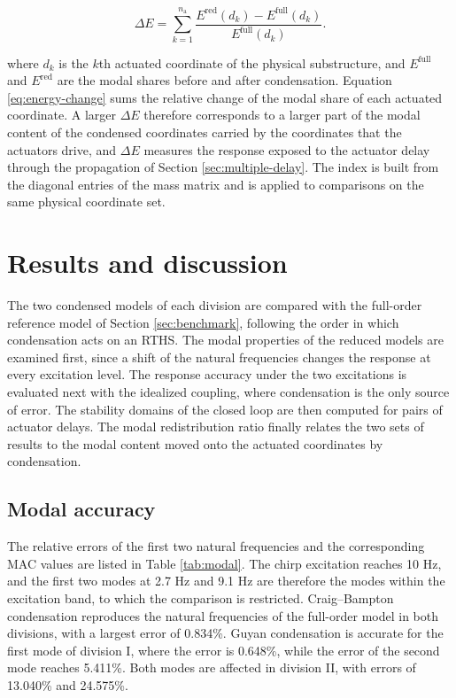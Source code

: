 \documentclass[a4paper,fleqn,review,12pt]{cas-sc}
\numberwithin{equation}{section}
\begin{document}
\vspace{-3.5em}
\begin{equation}
	\Delta E=\sum_{k=1}^{n_{\mathrm{a}}}
	\frac{E^{\mathrm{red}}(d_{k})-E^{\mathrm{full}}(d_{k})}{E^{\mathrm{full}}(d_{k})}.
	\label{eq:energy-change}
\end{equation}
\vspace{-3.5em}

\noindent where \(d_{k}\) is the \(k\)th actuated coordinate of the physical substructure, and \(E^{\mathrm{full}}\) and \(E^{\mathrm{red}}\) are the modal shares before and after condensation. Equation \eqref{eq:energy-change} sums the relative change of the modal share of each actuated coordinate. A larger \(\Delta E\) therefore corresponds to a larger part of the modal content of the condensed coordinates carried by the coordinates that the actuators drive, and \(\Delta E\) measures the response exposed to the actuator delay through the propagation of Section \ref{sec:multiple-delay}. The index is built from the diagonal entries of the mass matrix and is applied to comparisons on the same physical coordinate set.




\section{Results and discussion} \label{sec5}

The two condensed models of each division are compared with the full-order reference model of Section \ref{sec:benchmark}, following the order in which condensation acts on an RTHS. The modal properties of the reduced models are examined first, since a shift of the natural frequencies changes the response at every excitation level. The response accuracy under the two excitations is evaluated next with the idealized coupling, where condensation is the only source of error. The stability domains of the closed loop are then computed for pairs of actuator delays. The modal redistribution ratio finally relates the two sets of results to the modal content moved onto the actuated coordinates by condensation.

\subsection{Modal accuracy}
\label{sec:modal-accuracy}

The relative errors of the first two natural frequencies and the corresponding MAC values are listed in Table \ref{tab:modal}. The chirp excitation reaches 10 Hz, and the first two modes at 2.7 Hz and 9.1 Hz are therefore the modes within the excitation band, to which the comparison is restricted. Craig--Bampton condensation reproduces the natural frequencies of the full-order model in both divisions, with a largest error of 0.834\%. Guyan condensation is accurate for the first mode of division I, where the error is 0.648\%, while the error of the second mode reaches 5.411\%. Both modes are affected in division II, with errors of 13.040\% and 24.575\%.
\end{document}
